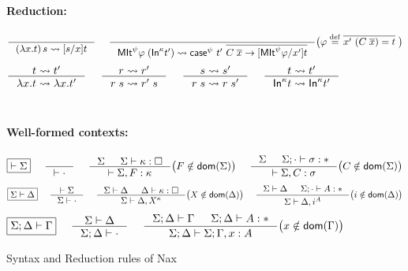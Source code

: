 \begin{figure}
\begin{framed}
\paragraph{Reduction:} 
\[ \inference{}{(\lambda x.t)\,s \rightsquigarrow [s/x]t}
 ~~~~
   \inference{}
      { \MIt^\psi \varphi\;(\In^\kappa t') \rightsquigarrow
        \case^\psi~t'~\overline{C\;\overline{x} -> [\MIt^\psi \varphi/x']t} }
      \big( \varphi \defeq \overline{x' ~ (C\;\overline{x}) = t}\; \big)
\]
\[  \inference{t \rightsquigarrow t'}{\lambda x.t \rightsquigarrow \lambda x.t'}
 ~~~~
   \inference{r \rightsquigarrow r'}{r\;s \rightsquigarrow r'\;s}
 ~~~~
   \inference{s \rightsquigarrow s'}{r\;s \rightsquigarrow r\;s'}
 ~~~~
   \inference{t \rightsquigarrow t'}
             {\In^\kappa t \rightsquigarrow \In^\kappa t'}
\]
~\\

\paragraph{Well-formed contexts:}
\[ \fbox{$|- \Sigma$}
 ~~~~
   \inference{}{|- \cdot}
 ~~~~
   \inference{\Sigma & \Sigma |- \kappa:\square}
             {|- \Sigma,F:\kappa}
      \big( F\notin\dom(\Sigma) \big)
 ~~~~
   \inference{\Sigma & \Sigma;\cdot |- \sigma:*}
             {|- \Sigma,C:\sigma}
      \big( C\notin\dom(\Sigma) \big)
\]
\[ \fbox{$\Sigma|- \Delta$}
 ~~~~
   \inference{|- \Sigma}{\Sigma |- \cdot}
 ~~~~
   \inference{\Sigma |- \Delta & \Delta |- \kappa:\square}
             {\Sigma |- \Delta,X^\kappa}
      \big( X\notin\dom(\Delta) \big)
 ~~~~ 
   \inference{\Sigma |- \Delta & \Sigma;\cdot |- A:*}
             {\Sigma |- \Delta,i^A}
      \big( i\notin\dom(\Delta) \big)
\]
\[ \fbox{$\Sigma;\Delta |- \Gamma$}
 ~~~~
   \inference{\Sigma |- \Delta}{\Sigma;\Delta |- \cdot}
 ~~~~
   \inference{\Sigma;\Delta |- \Gamma & \Sigma;\Delta |- A:*}
             {\Sigma;\Delta |- \Sigma;\Gamma,x:A}
      \big( x\notin\dom(\Gamma) \big)
\]
\end{framed}
\caption{Syntax and Reduction rules of Nax}
\label{fig:NaxSyntax}
\end{figure}


